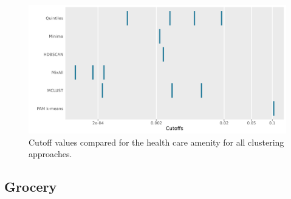 \documentclass[11pt, a4paper]{article}
\begin{document}
\begin{figure}[H]
\centering
\includegraphics[width=\textwidth]{./cutoff_ticks/Health care_ticks.png}
\caption[Health care cutoff comparison]{Cutoff values compared for the health care amenity for all clustering approaches.}\label{healthcareticks}
\end{figure}









\pagebreak
\justifying
\subsection{Grocery}
\end{document}

